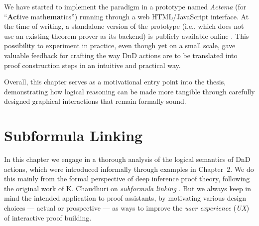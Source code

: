 \documentclass[11pt]{article}
\begin{document}
We have started to implement the paradigm in a prototype named \emph{Actema}
(for ``\textbf{Act}ive math\textbf{ema}tics'') running through a web
HTML/JavaScript interface. At the time of writing, a standalone
version of the prototype (i.e., which does not use an existing theorem prover as
its backend) is publicly available online \cite{Actema:link}. This possibility
to experiment in practice, even though yet on a small scale, gave valuable
feedback for crafting the way DnD actions are to be translated into proof
construction steps in an intuitive and practical way.


Overall, this chapter serves as a motivational entry point into the thesis, demonstrating how logical reasoning can be made more tangible through carefully designed graphical interactions that remain formally sound.

\section{Subformula Linking}

In this chapter we engage in a thorough analysis of the logical semantics of
DnD actions, which were introduced informally through examples in Chapter~2.
We do this mainly from the formal perspective of deep inference proof theory,
following the original work of K. Chaudhuri on \emph{subformula linking}
\cite{Chaudhuri2013}. But we always keep in mind the intended application to
proof assistants, by motivating various design choices --- actual or prospective ---
as ways to improve the \emph{user experience} (\emph{UX}) of interactive proof building.
\end{document}
